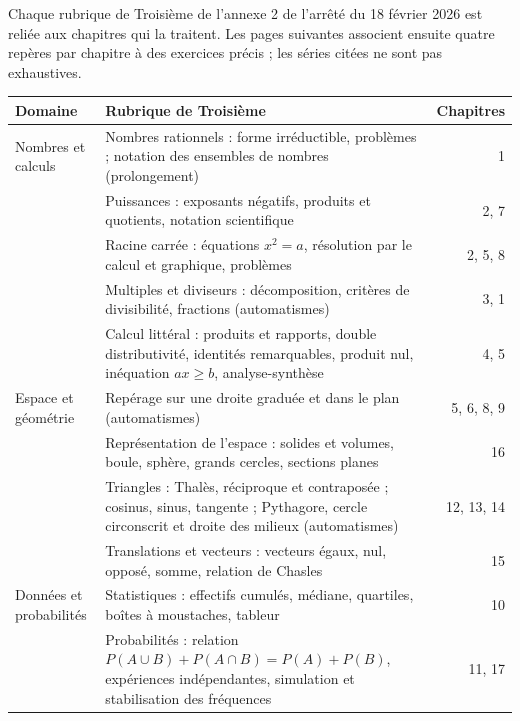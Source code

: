 \clearpage{}\label{couverture-programme}
\gdef\otChapNum{0}\pagestyle{otFront}
Chaque rubrique de Troisième de l’annexe 2 de l’arrêté du 18 février 2026 est
reliée aux chapitres qui la traitent. Les pages suivantes associent ensuite quatre
repères par chapitre à des exercices précis ; les séries citées ne sont pas exhaustives.\par\medskip
{\fontsize{9.5}{12.5}\selectfont
\begin{tabularx}{\linewidth}{@{}>{\raggedright\arraybackslash}p{32mm}Yr@{}}\toprule
Domaine & Rubrique de Troisième & Chapitres\\\midrule
Nombres et calculs & Nombres rationnels : forme irréductible, problèmes ; notation des ensembles de nombres (prolongement) & 1\\[1.6mm]
 & Puissances : exposants négatifs, produits et quotients, notation scientifique & 2, 7\\[1.6mm]
 & Racine carrée : équations $x^2=a$, résolution par le calcul et graphique, problèmes & 2, 5, 8\\[1.6mm]
 & Multiples et diviseurs : décomposition, critères de divisibilité, fractions (automatismes) & 3, 1\\[1.6mm]
 & Calcul littéral : produits et rapports, double distributivité, identités remarquables, produit nul, inéquation $ax\ge b$, analyse-synthèse & 4, 5\\[1.6mm]
Espace et géométrie & Repérage sur une droite graduée et dans le plan (automatismes) & 5, 6, 8, 9\\[1.6mm]
 & Représentation de l’espace : solides et volumes, boule, sphère, grands cercles, sections planes & 16\\[1.6mm]
 & Triangles : Thalès, réciproque et contraposée ; cosinus, sinus, tangente ; Pythagore, cercle circonscrit et droite des milieux (automatismes) & 12, 13, 14\\[1.6mm]
 & Translations et vecteurs : vecteurs égaux, nul, opposé, somme, relation de Chasles & 15\\[1.6mm]
Données et probabilités & Statistiques : effectifs cumulés, médiane, quartiles, boîtes à moustaches, tableur & 10\\[1.6mm]
 & Probabilités : relation $P(A\cup B)+P(A\cap B)=P(A)+P(B)$, expériences indépendantes, simulation et stabilisation des fréquences & 11, 17\\[1.6mm]

\end{tabularx}}
